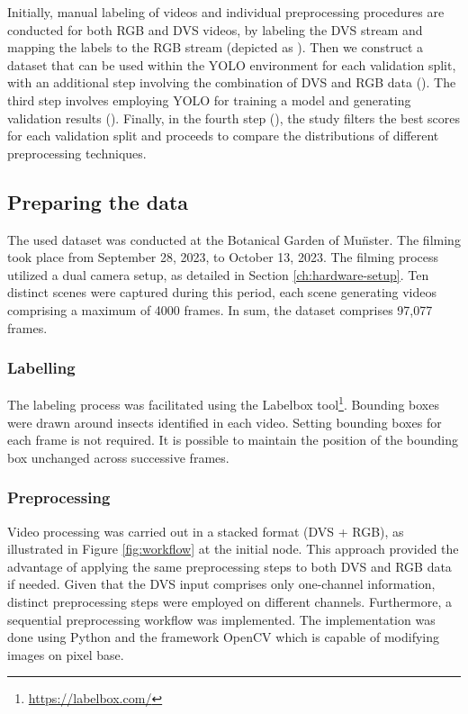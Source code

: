 \documentclass[sigchi,screen]{acmart}
\begin{document}
Initially, manual labeling of videos and individual preprocessing procedures are conducted for both RGB and DVS videos, by labeling the DVS stream and mapping the labels to the RGB stream (depicted as ). Then we construct a  dataset that can be used within the YOLO environment for each validation split, with an additional step involving the combination of DVS and RGB data (). The third step involves employing YOLO for training a model and generating validation results (). Finally, in the fourth step (), the study filters the best scores for each validation split and proceeds to compare the distributions of different preprocessing techniques.

\subsection{Preparing the data}
The used dataset was conducted at the Botanical Garden of Mu\"nster. The filming took place from September 28, 2023, to October 13, 2023. The filming process utilized a dual camera setup, as detailed in Section \ref{ch:hardware-setup}. Ten distinct scenes were captured during this period, each scene generating videos comprising a maximum of 4000 frames. In sum, the dataset comprises 97,077 frames. 

\subsubsection{Labelling}
The labeling process was facilitated using the Labelbox tool\footnote{\url{https://labelbox.com/}}. Bounding boxes were drawn around insects identified in each video. Setting bounding boxes for each frame is not required. It is possible to maintain the position of the bounding box unchanged across successive frames.

\subsubsection{Preprocessing}
Video processing was carried out in a stacked format (DVS + RGB), as illustrated in Figure \ref{fig:workflow} at the initial node. This approach provided the advantage of applying the same preprocessing steps to both DVS and RGB data if needed. Given that the DVS input comprises only one-channel information, distinct preprocessing steps were employed on different channels. Furthermore, a sequential preprocessing workflow was implemented. The implementation was done using Python and the framework OpenCV \citep{bradski2000opencv} which is capable of modifying images on pixel base.
\end{document}
